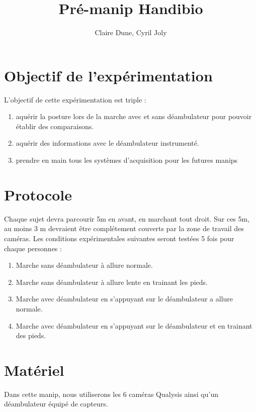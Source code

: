 \documentclass[a4paper, 10pt ]{article}
\title{\LARGE \bf
 Pré-manip Handibio
}
\author{Claire Dune, Cyril Joly}
\begin{document}
\maketitle
\thispagestyle{empty}
\pagestyle{empty}

\section{Objectif de l'expérimentation}

L'objectif de cette expérimentation est triple : 
\begin{enumerate}
\item aquérir la posture lors de la marche avec et sans déambulateur pour pouvoir établir des comparaisons. 
\item aquérir des informations avec le déambulateur instrumenté.
\item prendre en main tous les systèmes d'acquisition pour les futures manips
\end{enumerate}

\section{Protocole}

Chaque sujet devra parcourir 5m en avant, en marchant tout droit. Sur ces 5m, au moins 3 m devraient être complétement couverts par la zone de travail des caméras. Les conditions expérimentales suivantes seront testées 5 fois pour chaque personnes : 

\begin{enumerate}
\item Marche sans déambulateur à allure normale.
\item Marche sans déambulateur à allure lente en trainant les pieds.
\item Marche avec déambulateur en s'appuyant sur le déambulateur a allure normale.
\item Marche avec déambulateur en s'appuyant sur le déambulateur et en trainant des pieds.
\end{enumerate}

\section{Matériel}

Dans cette manip, nous utiliserons les 6 caméras Qualysis ainsi qu'un déambulateur équipé de capteurs.
\end{document}
